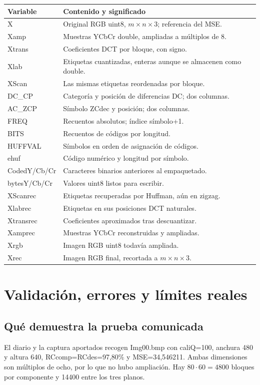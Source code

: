 \documentclass[11pt,a4paper,oneside]{report}
\begin{document}
\begin{longtable}{p{}p{}}
\toprule Variable & Contenido y significado\\\midrule\endhead
X & Original RGB uint8, $m\times n\times3$; referencia del MSE.\\
Xamp & Muestras YCbCr double, ampliadas a múltiplos de 8.\\
Xtrans & Coeficientes DCT por bloque, con signo.\\
Xlab & Etiquetas cuantizadas, enteras aunque se almacenen como double.\\
XScan & Las mismas etiquetas reordenadas por bloque.\\
DC\_CP & Categoría y posición de diferencias DC; dos columnas.\\
AC\_ZCP & Símbolo ZCdec y posición; dos columnas.\\
FREQ & Recuentos absolutos; índice símbolo+1.\\
BITS & Recuentos de códigos por longitud.\\
HUFFVAL & Símbolos en orden de asignación de códigos.\\
ehuf & Código numérico y longitud por símbolo.\\
CodedY/Cb/Cr & Caracteres binarios anteriores al empaquetado.\\
bytesY/Cb/Cr & Valores uint8 listos para escribir.\\
XScanrec & Etiquetas recuperadas por Huffman, aún en zigzag.\\
Xlabrec & Etiquetas en sus posiciones DCT naturales.\\
Xtransrec & Coeficientes aproximados tras descuantizar.\\
Xamprec & Muestras YCbCr reconstruidas y ampliadas.\\
Xrgb & Imagen RGB uint8 todavía ampliada.\\
Xrec & Imagen RGB final, recortada a $m\times n\times3$.\\\bottomrule
\end{longtable}


\chapter{Validación, errores y límites reales}
\section{Qué demuestra la prueba comunicada}

El diario y la captura aportados recogen Img00.bmp con caliQ=100,
anchura 480 y altura 640, RCcomp=RCdes=97,80\% y MSE=34,546211.
Ambas dimensiones son múltiplos de ocho, por lo que no hubo ampliación.
Hay $80\cdot60=4800$ bloques por componente y 14400 entre los tres planos.
\end{document}
